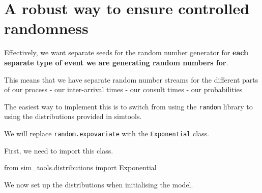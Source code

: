 \documentclass[
  letterpaper,
  DIV=11,
  numbers=noendperiod]{scrreprt}
\newenvironment{Shaded}{}{}
\newcommand{\ImportTok}[1]{\textcolor[rgb]{0.01,0.18,0.38}{#1}}
\newcommand{\NormalTok}[1]{\textcolor[rgb]{0.14,0.16,0.18}{#1}}
\begin{document}
\section{A robust way to ensure controlled randomness}\label{sec-robust}

Effectively, we want separate seeds for the random number generator for
\textbf{each separate type of event we are generating random numbers
for}.

This means that we have separate random number streams for the different
parts of our process - our inter-arrival times - our consult times - our
probabilities

The easiest way to implement this is to switch from using the
\texttt{random} library to using the distributions provided in simtools.

We will replace \texttt{random.expovariate} with the
\texttt{Exponential} class.

First, we need to import this class.

\begin{Shaded}
\begin{Highlighting}[]
\ImportTok{from}\NormalTok{ sim\_tools.distributions }\ImportTok{import}\NormalTok{ Exponential}
\end{Highlighting}
\end{Shaded}

We now set up the distributions when initialising the model.
\end{document}
